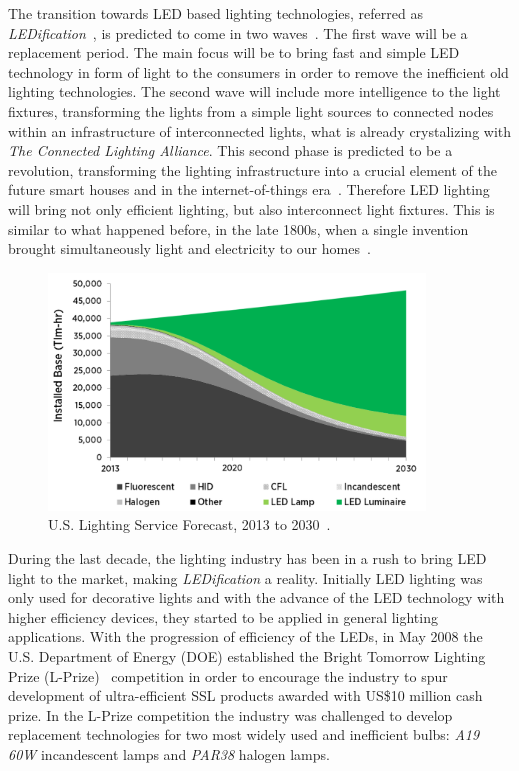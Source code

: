 The transition towards LED based lighting technologies, referred as \emph{LEDification}~\cite{13Hammerschmidt,15crawford}, is predicted to come in two waves~\cite{13liedenbaum}. The first wave will be a replacement period. The main focus will be to bring fast and simple LED technology in form of light to the consumers in order to remove the inefficient old lighting technologies. The second wave will include more intelligence to the light fixtures, transforming the lights from a simple light sources to connected nodes within an infrastructure of interconnected lights, what is already crystalizing with \emph{The Connected Lighting Alliance}. This second phase is predicted to be a revolution, transforming  the lighting infrastructure into a crucial element of the future smart houses and in the internet-of-things era~\cite{14Harbers}. Therefore LED lighting will bring not only efficient lighting, but also interconnect light fixtures. This is similar to what happened before, in the late 1800s, when a single invention brought simultaneously light and electricity to our homes~\cite{14NYISO}.

\begin{figure}[!h]
\centering
\includegraphics[width=10cm]{./0_intro/img/lighting_forecast.png}
\caption{U.S. Lighting Service Forecast, 2013 to 2030~\cite{14USDoE}.  }
\label{fig:lighting_forecast}
\end{figure}

During the last decade, the lighting industry has been in a rush to bring LED light to the market, making \emph{LEDification} a reality. Initially LED lighting was only used for decorative lights and with the advance of the LED technology with higher efficiency devices, they started to be applied in general lighting applications. With the progression of efficiency of the LEDs, in May 2008 the U.S. Department of Energy (DOE) established the Bright Tomorrow Lighting Prize (L-Prize)~\cite{web:LPrize,09Taub} competition in order to encourage the industry to spur development of ultra-efficient SSL products awarded with US\$10 million cash prize. In the L-Prize competition the industry was challenged to develop replacement technologies for two most widely used and inefficient bulbs: \emph{A19 60W} incandescent lamps and \emph{PAR38} halogen lamps.

